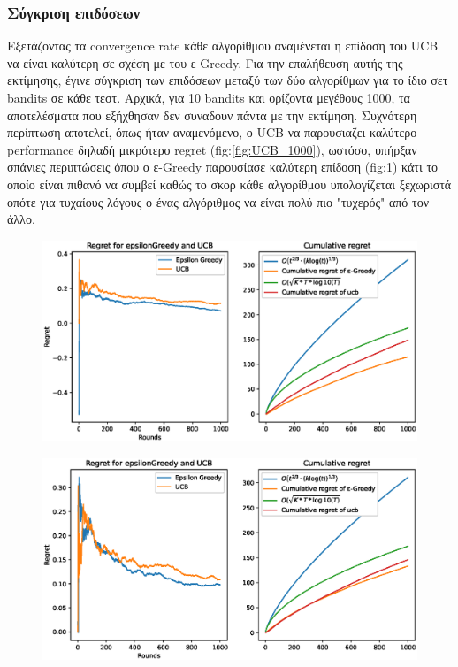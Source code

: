 \subsubsection*{Σύγκριση επιδόσεων}

Εξετάζοντας τα convergence rate κάθε αλγορίθμου αναμένεται η επίδοση του UCB να είναι καλύτερη σε σχέση με του ε-Greedy. Για την επαλήθευση αυτής της εκτίμησης, έγινε σύγκριση των επιδόσεων μεταξύ των δύο αλγορίθμων για το ίδιο σετ bandits σε κάθε τεστ. Αρχικά, για 10 bandits και ορίζοντα μεγέθους 1000, τα αποτελέσματα που εξήχθησαν δεν συναδουν πάντα με την εκτίμηση. Συχνότερη περίπτωση αποτελεί, όπως ήταν αναμενόμενο, ο UCB να παρουσιαζει καλύτερο performance δηλαδή μικρότερο regret (fig:\ref{fig:UCB_1000}), ωστόσο, υπήρξαν σπάνιες περιπτώσεις όπου ο ε-Greedy παρουσίασε καλύτερη επίδοση (fig:\ref{fig:epsilon_1000}) κάτι το οποίο είναι πιθανό να συμβεί καθώς το σκορ κάθε αλγορίθμου υπολογίζεται ξεχωριστά οπότε για τυχαίους λόγους ο ένας αλγόριθμος να είναι πολύ πιο "τυχερός" από τον άλλο. 

\begin{figure}[h]
	\centering
	\begin{minipage}{.5\textwidth}
	  \centering
	  \includegraphics[width=1\linewidth]{Images/Regret10_1000_UCB.eps}
	  \label{fig:UCB_1000}
	\end{minipage}%
	\begin{minipage}{.5\textwidth}
		\centering
		\includegraphics[width=1\linewidth]{Images/Regret10_1000_epsilon.eps}
		\label{fig:epsilon_1000}
	\end{minipage}
\end{figure}
\clearpage

